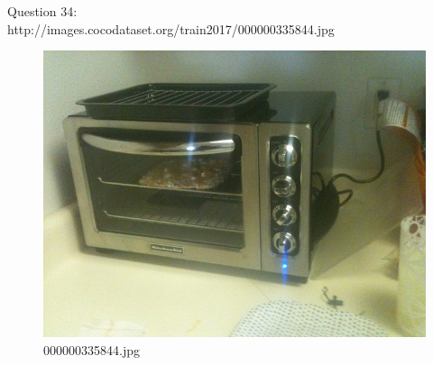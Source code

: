     Question 34:\\http://images.cocodataset.org/train2017/000000335844.jpg
    \begin{figure}[h]
        \centering
        \includegraphics[width=0.8\linewidth]{../image set/easy/000000335844.jpg}
        \caption{000000335844.jpg}
    \end{figure}
